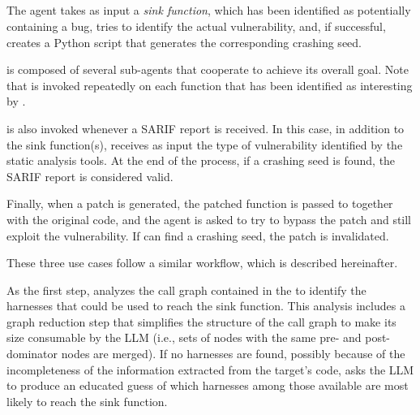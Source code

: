 \subsection{\discoveryguy}

The \discoveryguy agent takes as input a \emph{sink function}, which has been identified as potentially containing a bug, tries to identify the actual vulnerability, and, if successful, creates a Python script that generates the corresponding crashing seed. 

\discoveryguy is composed of several sub-agents that cooperate to achieve its overall goal. 
Note that \discoveryguy is invoked repeatedly on each function that has been identified as interesting by \codeswipe.


\discoveryguy is also invoked whenever a SARIF report is received.
In this case, in addition to the sink function(s), \discoveryguy receives as input the type of vulnerability identified by the static analysis tools.
At the end of the process, if a crashing seed is found, the SARIF report is considered valid.

Finally, when a patch is generated, the patched function is passed to \discoveryguy together with the original code, and the agent is asked to try to bypass the patch and still exploit the vulnerability.
If \discoveryguy can find a crashing seed, the patch is invalidated.

These three use cases follow a similar workflow, which is described hereinafter.

As the first step, \discoveryguy analyzes the call graph contained in the \analysisgraph to identify the harnesses that could be used to reach the sink function.
This analysis includes a graph reduction step that simplifies the structure of the call graph to make its size consumable by the LLM (i.e., sets of nodes with the same pre- and post-dominator nodes are merged).
If no harnesses are found, possibly because of the incompleteness of the information extracted from the target's code, \discoveryguy asks the LLM to produce an educated guess of which harnesses among those available are most likely to reach the sink function. 

